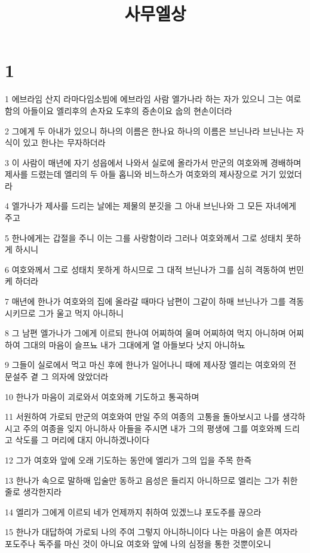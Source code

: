 

\title{사무엘상}


\chapter{1}

\par 1 에브라임 산지 라마다임소빔에 에브라임 사람 엘가나라 하는 자가 있으니 그는 여로함의 아들이요 엘리후의 손자요 도후의 증손이요 숩의 현손이더라
\par 2 그에게 두 아내가 있으니 하나의 이름은 한나요 하나의 이름은 브닌나라 브닌나는 자식이 있고 한나는 무자하더라
\par 3 이 사람이 매년에 자기 성읍에서 나와서 실로에 올라가서 만군의 여호와께 경배하며 제사를 드렸는데 엘리의 두 아들 홉니와 비느하스가 여호와의 제사장으로 거기 있었더라
\par 4 엘가나가 제사를 드리는 날에는 제물의 분깃을 그 아내 브닌나와 그 모든 자녀에게 주고
\par 5 한나에게는 갑절을 주니 이는 그를 사랑함이라 그러나 여호와께서 그로 성태치 못하게 하시니
\par 6 여호와께서 그로 성태치 못하게 하시므로 그 대적 브닌나가 그를 심히 격동하여 번민케 하더라
\par 7 매년에 한나가 여호와의 집에 올라갈 때마다 남편이 그같이 하매 브닌나가 그를 격동시키므로 그가 울고 먹지 아니하니
\par 8 그 남편 엘가나가 그에게 이르되 한나여 어찌하여 울며 어찌하여 먹지 아니하며 어찌하여 그대의 마음이 슬프뇨 내가 그대에게 열 아들보다 낫지 아니하뇨
\par 9 그들이 실로에서 먹고 마신 후에 한나가 일어나니 때에 제사장 엘리는 여호와의 전 문설주 곁 그 의자에 앉았더라
\par 10 한나가 마음이 괴로와서 여호와께 기도하고 통곡하며
\par 11 서원하여 가로되 만군의 여호와여 만일 주의 여종의 고통을 돌아보시고 나를 생각하시고 주의 여종을 잊지 아니하사 아들을 주시면 내가 그의 평생에 그를 여호와께 드리고 삭도를 그 머리에 대지 아니하겠나이다
\par 12 그가 여호와 앞에 오래 기도하는 동안에 엘리가 그의 입을 주목 한즉
\par 13 한나가 속으로 말하매 입술만 동하고 음성은 들리지 아니하므로 엘리는 그가 취한 줄로 생각한지라
\par 14 엘리가 그에게 이르되 네가 언제까지 취하여 있겠느냐 포도주를 끊으라
\par 15 한나가 대답하여 가로되 나의 주여 그렇지 아니하니이다 나는 마음이 슬픈 여자라 포도주나 독주를 마신 것이 아니요 여호와 앞에 나의 심정을 통한 것뿐이오니
